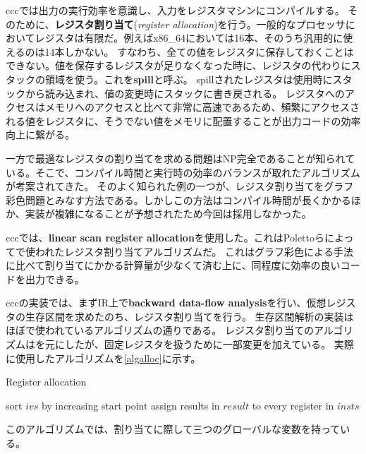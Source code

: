 \documentclass[../main.tex]{subfiles}
\begin{document}
cccでは出力の実行効率を意識し、入力をレジスタマシンにコンパイルする。
そのために、\textbf{レジスタ割り当て}(\textit{register allocation})を行う。一般的なプロセッサにおいてレジスタは有限だ。例えばx86\_64においては16本、そのうち汎用的に使えるのは14本しかない。
すなわち、全ての値をレジスタに保存しておくことはできない。値を保存するレジスタが足りなくなった時に、レジスタの代わりにスタックの領域を使う。これを\textbf{spill}と呼ぶ。
spillされたレジスタは使用時にスタックから読み込まれ、値の変更時にスタックに書き戻される。
レジスタへのアクセスはメモリへのアクセスと比べて非常に高速であるため、頻繁にアクセスされる値をレジスタに、そうでない値をメモリに配置することが出力コードの効率向上に繋がる。

一方で最適なレジスタの割り当てを求める問題はNP完全であることが知られている。そこで、コンパイル時間と実行時の効率のバランスが取れたアルゴリズムが考案されてきた。
そのよく知られた例の一つが、レジスタ割り当てをグラフ彩色問題とみなす方法\cite{chaitin1981register}である。しかしこの方法はコンパイル時間が長くかかるほか、実装が複雑になることが予想されたため今回は採用しなかった。

cccでは、\textbf{linear scan register allocation}を使用した。これはPolettoらによって\cite{poletto1997tcc}で使われたレジスタ割り当てアルゴリズムだ。
これはグラフ彩色による手法に比べて割り当てにかかる計算量が少なくて済む上に、同程度に効率の良いコードを出力できる。

cccの実装では、まずIR上で\textbf{backward data-flow analysis}\cite{av2009コンパイラ}を行い、仮想レジスタの生存区間を求めたのち、レジスタ割り当てを行う。
生存区間解析の実装はほぼ\cite{wimmer2004linear}で使われているアルゴリズムの通りである。
レジスタ割り当てのアルゴリズムは\cite{poletto1999linear}を元にしたが、固定レジスタを扱うために一部変更を加えている。
実際に使用したアルゴリズムを\cref{algalloc}に示す。

\begin{algorithm}[h]
\caption{Register allocation}\label{algalloc}
\begin{algorithmic}[1]
   \State sort $ivs$ by increasing start point
   \State {}
   \State assign results in $result$ to every register in $insts$
\EndProcedure
\end{algorithmic}
\end{algorithm}

このアルゴリズムでは、割り当てに際して三つのグローバルな変数を持っている。
\end{document}
